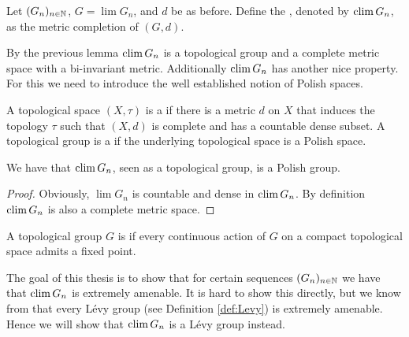 \begin{definition}
	Let $(G_n)_{n\in\mathbb{N}}$, $G=\lim G_n$, and $d$ be as before. Define the , denoted by $\operatorname{clim} G_n$, as the metric completion of $(G,d)$.
\end{definition}
By the previous lemma $\operatorname{clim} G_n$ is a topological group and a complete metric space with a bi-invariant metric. 
Additionally $\operatorname{clim} G_n$ has another nice property. For this we need to introduce the well established notion of Polish spaces. 
\begin{definition}
	A topological space $(X,\tau)$ is a  if there is a metric $d$ on $X$ that induces the topology $\tau$ such that $(X,d)$ is complete and has a countable dense subset. A topological group is a  if the underlying topological space is a Polish space.
\end{definition}
		
\begin{lemma}\label{lem:climIsPolish}
	We have that $\operatorname{clim} G_n$, seen as a topological group, is a Polish group.
\end{lemma}
\begin{proof}
	Obviously, $\lim G_n$ is countable and dense in $\operatorname{clim} G_n$. By definition $\operatorname{clim} G_n$ is also a complete metric space.
\end{proof}
		
\begin{definition}
	A topological group $G$ is  if every continuous action of $G$ on a compact topological space admits a fixed point.
\end{definition}
		
The goal of this thesis is to show that for certain sequences $(G_n)_{n\in\mathbb{N}}$ we have that $\operatorname{clim} G_n$ is extremely amenable. It is hard to show this directly, but we know from \cite{AzemaLevy} that every L\'evy group (see Definition \ref{def:Levy}) is extremely amenable. Hence we will show that $\operatorname{clim} G_n$ is a L\'evy group instead.
		
		
		
		
